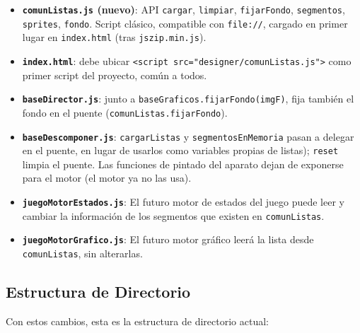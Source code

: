   \begin{itemize}
  	\item \textbf{\texttt{comunListas.js} (nuevo)}: API \texttt{cargar}, \texttt{limpiar},
  	\texttt{fijarFondo}, \texttt{segmentos}, \texttt{sprites}, \texttt{fondo}. Script
  	clásico, compatible con \texttt{file://}, cargado en primer lugar en
  	\texttt{index.html} (tras \texttt{jszip.min.js}).
  	 	
  	\item \textbf{\texttt{index.html}}: debe ubicar \texttt{<script src="designer/comunListas.js">} como primer script del proyecto, común a todos.

  	\item \textbf{\texttt{baseDirector.js}}: junto a
	\texttt{baseGraficos.fijarFondo(imgF)}, fija también el fondo en el puente
	(\texttt{comunListas.fijarFondo}).

  	\item \textbf{\texttt{baseDescomponer.js}}: \texttt{cargarListas} y
  	\texttt{segmentosEnMemoria} pasan a delegar en el puente, en lugar de usarlos como variables
  	propias de listas); \texttt{reset} limpia el puente. Las funciones de pintado del
  	aparato dejan de exponerse para el motor (el motor ya no las usa).
  	
 	\item \textbf{\texttt{juegoMotorEstados.js}}: El futuro motor de estados del juego 
 	 puede leer y cambiar la información de los segmentos que existen en \texttt{comunListas}. 
  	
  	\item \textbf{\texttt{juegoMotorGrafico.js}}: El futuro motor gráfico leerá la lista desde \texttt{comunListas}, sin alterarlas. 
  	
  \end{itemize}
  
  \clearpage
  
  \subsection{Estructura de Directorio}
  \label{subsec:EstructuraDirectorioF2I1}
   Con estos cambios, esta es la estructura de directorio actual:
  
 
 
